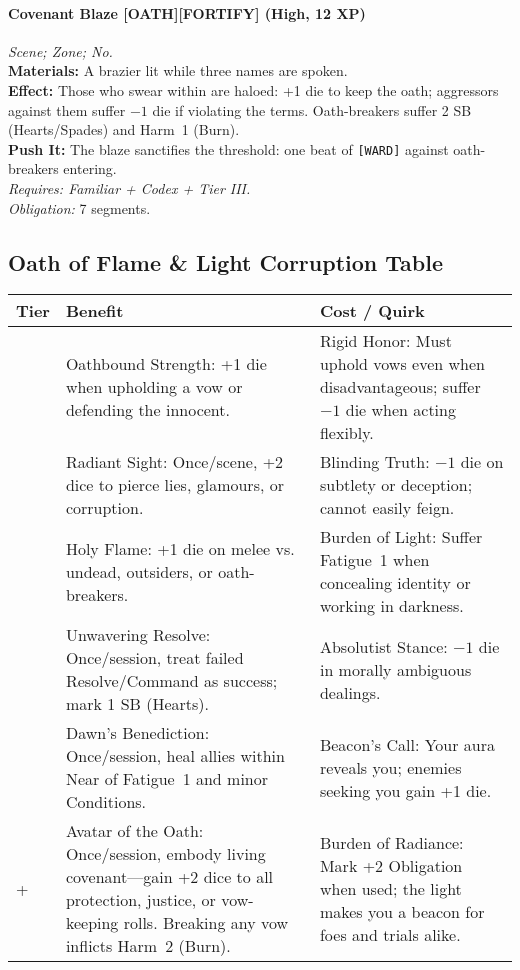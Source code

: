 \paragraph{Covenant Blaze \textnormal{[OATH][FORTIFY]} (High, 12 XP)} \emph{Scene; Zone; No.}\\
\textbf{Materials:} A brazier lit while three names are spoken.\\
\textbf{Effect:} Those who swear within are haloed: +1 die to keep the oath; aggressors against them suffer \(-1\) die if violating the terms. Oath-breakers suffer 2 SB (Hearts/Spades) and Harm~1 (Burn).\\
\textbf{Push It:} The blaze sanctifies the threshold: one beat of \texttt{[WARD]} against oath-breakers entering.\\
\emph{Requires: Familiar + Codex + Tier III.}\\
\emph{Obligation:} 7 segments.

\subsection*{Oath of Flame \& Light Corruption Table}
\label{sec:oath-flame-light-corruption}

\begin{longtable}{>{\raggedright\arraybackslash}p{1cm} p{5cm} p{5cm}}
\toprule
\textbf{Tier} & \textbf{Benefit} & \textbf{Cost / Quirk} \\
\midrule
1 & Oathbound Strength: +1 die when upholding a vow or defending the innocent. & Rigid Honor: Must uphold vows even when disadvantageous; suffer \(-1\) die when acting flexibly. \\
\midrule
2 & Radiant Sight: Once/scene, +2 dice to pierce lies, glamours, or corruption. & Blinding Truth: \(-1\) die on subtlety or deception; cannot easily feign. \\
\midrule
3 & Holy Flame: +1 die on melee vs. undead, outsiders, or oath-breakers. & Burden of Light: Suffer Fatigue~1 when concealing identity or working in darkness. \\
\midrule
4 & Unwavering Resolve: Once/session, treat failed Resolve/Command as success; mark 1 SB (Hearts). & Absolutist Stance: \(-1\) die in morally ambiguous dealings. \\
\midrule
5 & Dawn’s Benediction: Once/session, heal allies within Near of Fatigue~1 and minor Conditions. & Beacon’s Call: Your aura reveals you; enemies seeking you gain +1 die. \\
\midrule
6+ & Avatar of the Oath: Once/session, embody living covenant—gain +2 dice to all protection, justice, or vow-keeping rolls. Breaking any vow inflicts Harm~2 (Burn). & Burden of Radiance: Mark +2 Obligation when used; the light makes you a beacon for foes and trials alike. \\
\bottomrule
\end{longtable}